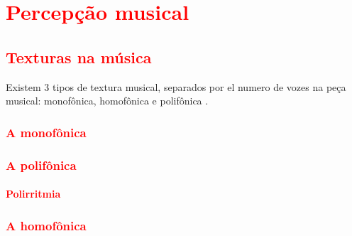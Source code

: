 


\chapter{\textcolor{red}{Percepção musical}}
\label{cap:percepcaomusical}

\section{\textcolor{red}{Texturas na música}}
Existem 3 tipos de textura musical, separados por el numero de vozes na peça musical: monofônica, homofônica e
polifônica \cite[pp. 29]{kerman2015listen} \cite{copland1974ouvir} \cite[pp. 322]{harnum2009basic}.

\subsection{\textcolor{red}{A monofônica}}

\cite[pp. 42]{bennett1993elementos}
\cite[pp. 29]{kerman2015listen} \cite{copland1974ouvir} 
\cite[pp. 38]{schurmann1989m} \cite[pp. 57]{holland2013music}
\cite[pp. 687]{apel1969harvard}

\subsection{\textcolor{red}{A polifônica}}
\cite[pp. 42]{bennett1993elementos}
\cite[pp. 29]{kerman2015listen} \cite{copland1974ouvir} 
\cite[pp. 64]{schurmann1989m} \cite[pp. 59]{holland2013music}
\cite[pp. 687]{apel1969harvard}

\subsubsection{\textcolor{red}{Polirritmia}}
\cite[pp. 93]{alves2004teoria}
\cite[pp. 35]{holland2013music}
\cite[pp. 687]{apel1969harvard}

\subsection{\textcolor{red}{A homofônica}}
\cite[pp. 42]{bennett1993elementos}
\cite[pp. 29]{kerman2015listen} \cite{copland1974ouvir} 
\cite[pp. 121]{schurmann1989m} \cite[pp. 58]{holland2013music}
\cite[pp. 687]{apel1969harvard}


